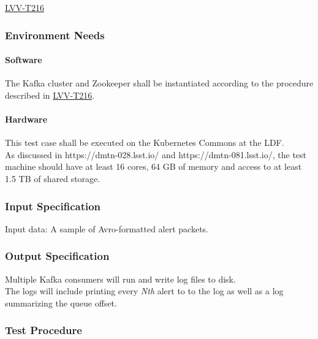 \href{https://jira.lsstcorp.org/secure/Tests.jspa\#/testCase/LVV-T216}{LVV-T216}



\subsubsection{Environment Needs}

\paragraph{Software}

The Kafka cluster and Zookeeper shall be instantiated according to the
procedure described in
\href{https://jira.lsstcorp.org/secure/Tests.jspa\#/testCase/LVV-T216}{LVV-T216}.



\paragraph{Hardware}

This test case shall be executed on the Kubernetes Commons at the LDF.\\
As discussed in https://dmtn-028.lsst.io/ and https://dmtn-081.lsst.io/,
the test machine should have at least 16 cores, 64 GB of memory and
access to at least 1.5 TB of shared storage.



\subsubsection{Input Specification}

Input data: A sample of Avro-formatted alert packets.



\subsubsection{Output Specification}

Multiple Kafka consumers will run and write log files to disk.\\
The logs will include printing every \emph{Nth} alert to to the log as
well as a log summarizing the queue offset.



\subsubsection{Test Procedure}

